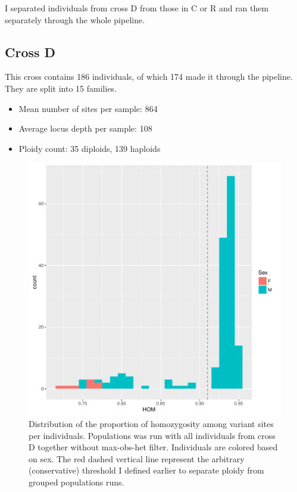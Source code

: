 \documentclass[10pt,a4paper]{report}
\begin{document}
I separated individuals from cross D from those in C or R and ran them separately through the whole pipeline.

\subsection{Cross D}

This cross contains 186 individuals, of which 174 made it through the pipeline. They are split into 15 families. 

\begin{itemize}
\item Mean number of sites per sample: 864
\item Average locus depth per sample: 108
\item Ploidy count: 35 diploids, 139 haploids
\end{itemize}

\begin{figure}
\begin{center}
\includegraphics[width=\textwidth]{final_samples/hom_Sex_popgroup_d20_D.pdf}
\caption{Distribution of the proportion of homozygosity among variant sites per individuals. Populations was run with all individuals from cross D together without max-obs-het filter. Individuals are colored based on sex. The red dashed vertical line represent the arbitrary (conservative) threshold I defined earlier to separate ploidy from grouped populations runs.}
\label{D_hom_grouped}
\end{center}
\end{figure}
\end{document}
